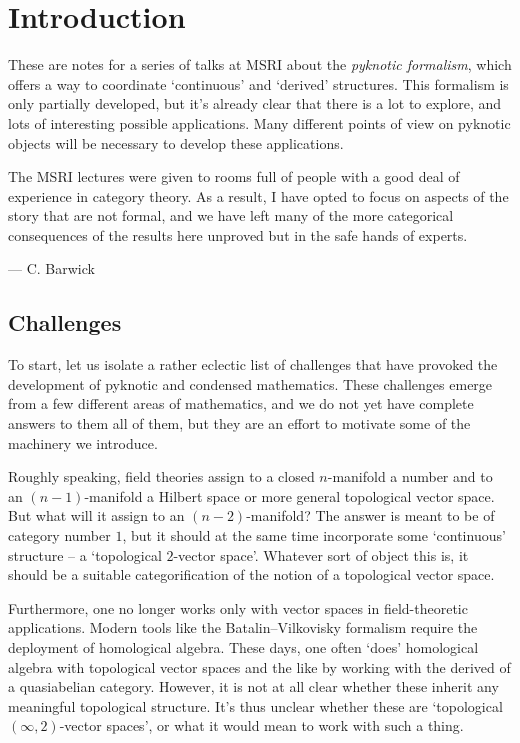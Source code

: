 
\section*{Introduction}

These are notes for a series of talks at MSRI about the \emph{pyknotic formalism}, which offers a way to coordinate `continuous' and `derived' structures.
This formalism is only partially developed, but it’s already clear that there is a lot to explore, and lots of interesting possible applications.
Many different points of view on pyknotic objects will be necessary to develop these applications.

The MSRI lectures were given to rooms full of people with a good deal of experience in category theory.
As a result, I have opted to focus on aspects of the story that are not formal, and we have left many of the more categorical consequences of the results here unproved but in the safe hands of experts.

\noindent --- C. Barwick

\subsection*{Challenges}

To start, let us isolate a rather eclectic list of challenges that have provoked the development of pyknotic and condensed mathematics.
These challenges emerge from a few different areas of mathematics, and we do not yet have complete answers to them all of them, but they are an effort to motivate some of the machinery we introduce.

\begin{exm*}	
	Roughly speaking, field theories assign to a closed $ n $-manifold a number and to an $ (n-1) $-manifold a Hilbert space or more general topological vector space.
	But what will it assign to an $ (n-2) $-manifold?
	The answer is meant to be of category number $ 1 $, but it should at the same time incorporate some `continuous' structure -- a `topological $ 2 $-vector space'.
	Whatever sort of object this is, it should be a suitable categorification of the notion of a topological vector space.

	Furthermore, one no longer works only with vector spaces in field-theoretic applications.
	Modern tools like the Batalin--Vilkovisky formalism require the deployment of homological algebra.
	These days, one often `does' homological algebra with topological vector spaces and the like by working with the derived \category of a quasiabelian category.
	However, it is not at all clear whether these \categories inherit any meaningful topological structure.
	It's thus unclear whether these \categories are `topological $ (\infty,2) $-vector spaces', or what it would mean to work with such a thing.
\end{exm*}


